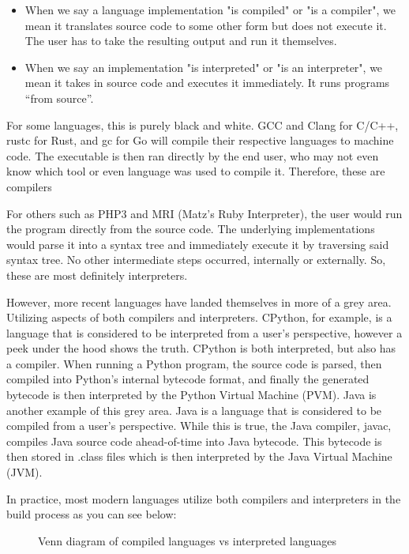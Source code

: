 \documentclass[./subfile.tex]{subfiles}
\begin{document}
        \begin{itemize}
            \item When we say a language implementation "is compiled" or "is a compiler", we mean it translates source code to some other form but does not execute it. The user has to take the resulting output and run it themselves.
            \item When we say an implementation "is interpreted" or "is an interpreter", we mean it takes in source code and executes it immediately. It runs programs “from source”.
        \end{itemize}
        
        For some languages, this is purely black and white. GCC and Clang for C/C++, rustc for Rust, and gc for Go will compile their respective languages to machine code. The executable is then ran directly by the end user, who may not even know which tool or even language was used to compile it. Therefore, these are compilers
        
        For others such as PHP3 and MRI (Matz's Ruby Interpreter), the user would run the program directly from the source code. The underlying implementations would parse it into a syntax tree and immediately execute it by traversing said syntax tree. No other intermediate steps occurred, internally or externally. So, these are most definitely interpreters.
        
        However, more recent languages have landed themselves in more of a grey area. Utilizing aspects of both compilers and interpreters. CPython, for example, is a language that is considered to be interpreted from a user's perspective, however a peek under the hood shows the truth. CPython is both interpreted, but also has a compiler. When running a Python program, the source code is parsed, then compiled into Python's internal bytecode format, and finally the generated bytecode is then interpreted by the Python Virtual Machine (PVM). Java is another example of this grey area. Java is a language that is considered to be compiled from a user's perspective. While this is true, the Java compiler, javac, compiles Java source code ahead-of-time into Java bytecode. This bytecode is then stored in .class files which is then interpreted by the Java Virtual Machine (JVM).
        
        In practice, most modern languages utilize both compilers and interpreters in the build process as you can see below:
        
        \begin{figure}[h!]
            \centering
            
            \caption{Venn diagram of compiled languages vs interpreted languages\cite{nystrom_2021}}
        \end{figure}
    
\end{document}
